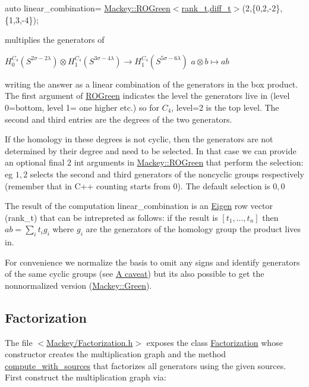 {\ttfamily  auto linear\+\_\+combination= \hyperlink{namespaceMackey_a2bd86833844ca62d76c47a54aeb0bb77}{Mackey\+::\+R\+O\+Green$<$rank\+\_\+t,diff\+\_\+t$>$}(2,\{0,2,-\/2\},\{1,3,-\/4\}); }

multiplies the generators of

$ H_0^{C_4}(S^{2\sigma-2\lambda}) \otimes H_1^{C_4}(S^{3\sigma-4\lambda}) \to H_1^{C_4}(S^{5\sigma-6\lambda}) $ $ a\otimes b\mapsto ab$

writing the answer as a linear combination of the generators in the box product. The first argument of \hyperlink{namespaceMackey_a2bd86833844ca62d76c47a54aeb0bb77}{R\+O\+Green} indicates the level the generators live in (level 0=bottom, level 1= one higher etc.) so for $C_4$, level=2 is the top level. The second and third entries are the degrees of the two generators.

If the homology in these degrees is not cyclic, then the generators are not determined by their degree and need to be selected. In that case we can provide an optional final 2 {\ttfamily int} arguments in {\ttfamily \hyperlink{namespaceMackey_a2bd86833844ca62d76c47a54aeb0bb77}{Mackey\+::\+R\+O\+Green}} that perform the selection\+: eg $1,2$ selects the second and third generators of the noncyclic groups respectively (remember that in C++ counting starts from $0$). The default selection is $0,0$

The result of the computation {\ttfamily linear\+\_\+combination} is an \hyperlink{namespaceEigen}{Eigen} row vector ({\ttfamily rank\+\_\+t}) that can be intrepreted as follows\+: if the result is $[t_1,...,t_n]$ then $ ab=\sum_it_ig_i$ where $g_i$ are the generators of the homology group the product lives in.

For convenience we normalize the basis to omit any signs and identify generators of the same cyclic groups (see \hyperlink{math_caveat}{A caveat}) but it\textquotesingle{}s also possible to get the nonnormalized version (\hyperlink{classMackey_1_1Green}{Mackey\+::\+Green}).\hypertarget{use_step1fact}{}\subsection{Factorization}\label{use_step1fact}
The file {\ttfamily $<$\hyperlink{Factorization_8h}{Mackey/\+Factorization.\+h}$>$} exposes the class \hyperlink{classMackey_1_1Factorization}{Factorization} whose constructor creates the multiplication graph and the method \hyperlink{classMackey_1_1Factorization_a2e135a37687fc3d69cd16a8729dd19eb}{compute\+\_\+with\+\_\+sources} that factorizes all generators using the given sources. First construct the multiplication graph via\+:

